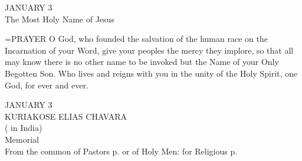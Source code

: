 \begin{center}\normalsize JANUARY 3\\
\footnotesize The Most Holy Name of Jesus\\
\end{center}

\hangindent=\parindent \small{PRAYER 
O God, who founded the salvation of the human race
on the Incarnation of your Word,
give your peoples the mercy they implore,
so that all may know there is no other name to be invoked
but the Name of your Only Begotten Son.
Who lives and reigns with you in the unity of the Holy Spirit,
one God, for ever and ever.\\}
 
\begin{center}\normalsize JANUARY 3\\
\footnotesize KURIAKOSE ELIAS CHAVARA\\
\footnotesize ( in India)\\
\footnotesize Memorial\\
\footnotesize From the common of Pastors p.   or of Holy Men: for Religious p.  \\
\end{center}

 

